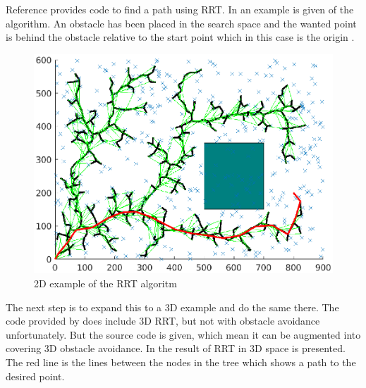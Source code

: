 Reference \cite{rrt} provides code to find a path using RRT. In  an example is given of the algorithm. An obstacle has been placed in the search space and the wanted point is behind the obstacle relative to the start point which in this case is the origin \cite{rrt}.
\begin{figure}[htbp]
  \centering
  \includegraphics[width=.9\textwidth]{img/rrt2dex.eps}
  \caption{2D example of the RRT algoritm}
  \label{fig:rrt2dex}
\end{figure}
The next step is to expand this to a 3D example and do the same there. The code provided by \cite{rrt} does include 3D RRT, but not with obstacle avoidance unfortunately. But the source code is given, which mean it can be augmented into covering 3D obstacle avoidance. In  the result of RRT in 3D space is presented. The red line is the lines between the nodes in the tree which shows a path to the desired point. 
\def\picsSiz{1.08}
